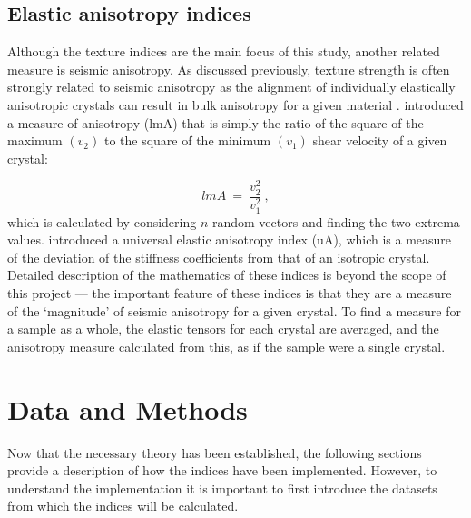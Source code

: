 \documentclass[a4paper,12pt,twoside]{report}
\numberwithin{equation}{chapter}
\begin{document}
\section{Elastic anisotropy indices} \label{sec:anisotropy_indices}

Although the texture indices are the main focus of this study, another related measure is seismic anisotropy. As discussed previously, texture strength is often strongly related to seismic anisotropy as the alignment of individually elastically anisotropic crystals can result in bulk anisotropy for a given material \citep[e.g.][]{Tommasi1999,Miyagi2010}. \cite{Ledbetter2006} introduced a measure of anisotropy (lmA) that is simply the ratio of the square of the maximum $(v_2)$ to the square of the minimum $(v_1)$ shear velocity of a given crystal:

\begin{equation}
lmA\ =\ \frac{v_2^2}{v_1^2}\ ,
\end{equation}   
\noindent
which is calculated by considering $n$ random vectors and finding the two extrema values. \cite{Ranganathan2008} introduced a universal elastic anisotropy index (uA), which is a measure of the deviation of the stiffness coefficients from that of an isotropic crystal. Detailed description of the mathematics of these indices is beyond the scope of this project \citep[for full descriptions see][]{Ledbetter2006,Ranganathan2008} --- the important feature of these indices is that they are a measure of the \lq{}magnitude\rq{} of seismic anisotropy for a given crystal. To find a measure for a sample as a whole, the elastic tensors for each crystal are averaged, and the anisotropy measure calculated from this, as if the sample were a single crystal. 

\chapter{Data and Methods} \label{chap:methods}
\vspace{-1cm}

Now that the necessary theory has been established, the following sections provide a description of how the indices have been implemented. However, to understand the implementation it is important to first introduce the datasets from which the indices will be calculated.  
\end{document}
